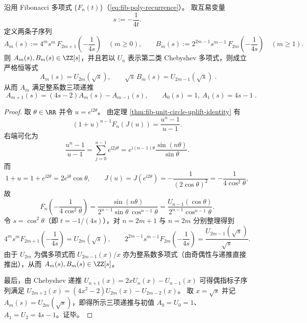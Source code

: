 \begin{theorem}\label{thm:fib-chebyshev-parity-splitting}
沿用 Fibonacci 多项式 \(\{F_n(t)\}\)（\eqref{eq:fib-poly-recurrence}）。
取互易变量
\[
s:=-\frac{1}{4t}.
\]
定义两条子序列
\[
A_m(s):=4^{m}s^{m}\,F_{2m+1}\!\left(-\frac{1}{4s}\right)\quad(m\ge 0),
\qquad
B_m(s):=2^{2m-1}s^{m-1}\,F_{2m}\!\left(-\frac{1}{4s}\right)\quad(m\ge 1).
\]
则 \(A_m(s),B_m(s)\in\ZZ[s]\)，并且若以 \(U_n\) 表示第二类 Chebyshev 多项式，则成立严格恒等式
\[
\boxed{\;
A_m(s)=U_{2m}(\sqrt{s}),\qquad \sqrt{s}\,B_m(s)=U_{2m-1}(\sqrt{s})\; }.
\]
从而 \(A_m\) 满足整系数三项递推
\[
\boxed{\;
A_{m+1}(s)=(4s-2)A_m(s)-A_{m-1}(s),\qquad A_0(s)=1,\ A_1(s)=4s-1\; }.
\]
\end{theorem}
\begin{proof}
取 \(\theta\in\RR\) 并令 \(u=e^{\mathrm{i}2\theta}\)。
由定理 \ref{thm:fib-unit-circle-uplift-identity} 有
\[
(1+u)^{n-1}F_n(J(u))=\frac{u^n-1}{u-1}.
\]
右端可化为
\[
\frac{u^n-1}{u-1}
=\sum_{j=0}^{n-1}e^{\mathrm{i}2j\theta}
=e^{\mathrm{i}(n-1)\theta}\frac{\sin(n\theta)}{\sin\theta}.
\]
而
\[
1+u=1+e^{\mathrm{i}2\theta}=2e^{\mathrm{i}\theta}\cos\theta,
\qquad
J(u)=J(e^{\mathrm{i}2\theta})=-\frac{1}{(2\cos\theta)^2}=-\frac{1}{4\cos^2\theta},
\]
故
\[
F_n\!\left(-\frac{1}{4\cos^2\theta}\right)
=\frac{\sin(n\theta)}{2^{n-1}\sin\theta\ \cos^{n-1}\theta}
=\frac{U_{n-1}(\cos\theta)}{2^{n-1}\cos^{n-1}\theta}.
\]
令 \(s=\cos^2\theta\)（即 \(t=-1/(4s)\)），对 \(n=2m+1\) 与 \(n=2m\) 分别整理得到
\[
4^{m}s^{m}F_{2m+1}\!\left(-\frac{1}{4s}\right)=U_{2m}(\sqrt{s}),
\qquad
2^{2m-1}s^{m-1}F_{2m}\!\left(-\frac{1}{4s}\right)=\frac{U_{2m-1}(\sqrt{s})}{\sqrt{s}}.
\]
由于 \(U_{2m}\) 为偶多项式而 \(U_{2m-1}(x)/x\) 亦为整系数多项式（由奇偶性与递推直接推出），从而 \(A_m(s),B_m(s)\in\ZZ[s]\)。
\par
最后，由 Chebyshev 递推 \(U_{n+1}(x)=2xU_n(x)-U_{n-1}(x)\) 可得偶指标子序列满足
\(
U_{2m+2}(x)=(4x^2-2)U_{2m}(x)-U_{2m-2}(x)
\)。
取 \(x=\sqrt{s}\) 并记 \(A_m(s)=U_{2m}(\sqrt{s})\)，即得所示三项递推与初值 \(A_0=U_0=1\)、\(A_1=U_2=4s-1\)。证毕。
\end{proof}

\endinput
